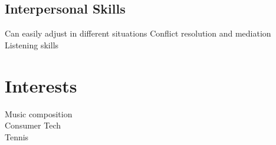 \documentclass[]{dske-resume-openfont}
\begin{document}
\begin{minipage}[t]{0.33\textwidth}
\sectionsep

\subsection{Interpersonal Skills}
Can easily adjust in different situations \textbullet{} Conflict resolution and mediation \textbullet{} Listening skills\\

\sectionsep

\section{Interests}
Music composition\\
Consumer Tech\\
Tennis\\



%
%

\end{minipage} 
\hfill
\end{document}
